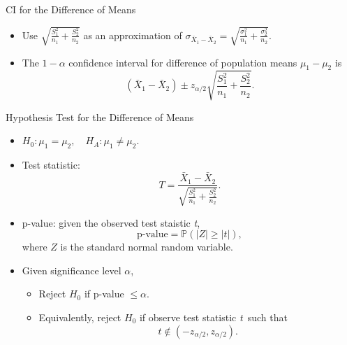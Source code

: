 \documentclass{beamer}
\newcommand{\pr}{\mathbb{P}}
\newcommand{\TS}{\textit{T}}
\newcommand{\ts}{\textit{t}}
\begin{document}
\begin{frame}{CI for the Difference of Means}
\begin{itemize}
\item Use $\sqrt{\frac{S_1^2}{n_1} + \frac{S_2^2}{n_2} }$ as an approximation of $\sigma_{\bar X_1-\bar X_2}=\sqrt{\frac{\sigma_1^2}{n_1} + \frac{\sigma_2^2}{n_2} }$.
    \item The $1-\alpha$ confidence interval for difference of population means $\mu_1 - \mu_2$ is 
    $$
    (\bar X_1 -\bar X_2) \pm z_{\alpha/2} \sqrt{\frac{S_1^2}{n_1} + \frac{S_2^2}{n_2} }.
    $$
\end{itemize}
\end{frame}

\begin{frame}{Hypothesis Test for the Difference of Means}
    \begin{itemize}
        \item $H_0: \mu_1 = \mu_2, \quad H_A: \mu_1 \ne \mu_2$.
        \item Test statistic:
            $$\TS = \frac{\bar X_1 - \bar X_2}{\sqrt{\frac{S_1^2}{n_1} + \frac{S_2^2}{n_2} }}.$$
        \item p-value: given the observed test staistic \ts,
        $$\text{p-value}=\pr(|Z| \geq |\ts|),$$
        where $Z$ is the standard normal random variable.
    \item Given significance level $\alpha$, 
        \begin{itemize}
            \item Reject $H_0$ if p-value $\leq \alpha$.
            \item Equivalently, reject $H_0$ if observe test statistic \ts\ such that
                $$t \not\in (-z_{\alpha/2}, z_{\alpha/2}).$$
        \end{itemize}
\end{itemize}
\end{frame}
\end{document}
